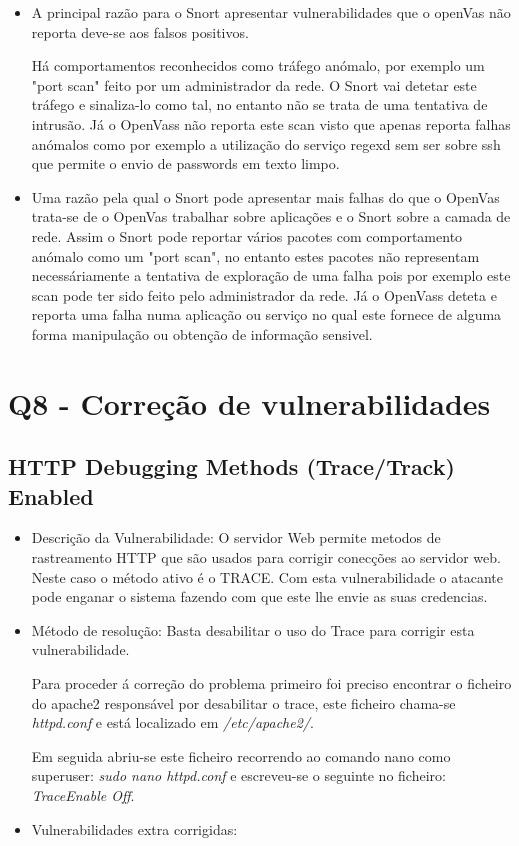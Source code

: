 \begin{itemize}
\item A principal razão para o Snort apresentar vulnerabilidades que o openVas não reporta deve-se aos falsos positivos.
\par Há comportamentos reconhecidos como tráfego anómalo, por exemplo um "port scan" feito por um administrador da rede. O Snort vai detetar este tráfego e sinaliza-lo como tal, no entanto não se trata de uma tentativa de intrusão. Já o OpenVass não reporta este scan visto que apenas reporta falhas anómalos como por exemplo a utilização do serviço regexd sem ser sobre ssh que permite o envio de passwords em texto limpo.   

\item Uma razão pela qual o Snort pode apresentar mais falhas do que o OpenVas trata-se de o OpenVas trabalhar sobre aplicações e o Snort sobre a camada de rede. Assim o Snort pode reportar vários pacotes com comportamento anómalo como um "port scan", no entanto estes pacotes não representam necessáriamente a tentativa de exploração de uma falha pois por exemplo este scan pode ter sido feito pelo administrador da rede. Já o OpenVass deteta e reporta uma falha numa aplicação ou serviço no qual este fornece de alguma forma manipulação ou obtenção de informação sensivel.

\end{itemize}
\section{Q8 - Correção de vulnerabilidades}

\subsection{HTTP Debugging Methods (Trace/Track) Enabled}

\begin{itemize}
\item Descrição da Vulnerabilidade: O servidor Web permite metodos de rastreamento HTTP que são usados para corrigir conecções ao servidor web.
Neste caso o método ativo é o TRACE. Com esta vulnerabilidade o atacante pode enganar o sistema fazendo com que este lhe envie as suas credencias.

\item Método de resolução: Basta desabilitar o uso do Trace para corrigir esta vulnerabilidade.

\par Para proceder á correção do problema primeiro foi preciso encontrar o ficheiro do apache2 responsável por desabilitar o trace, este ficheiro chama-se \textit{httpd.conf} e está localizado em \textit{/etc/apache2/}.
\par Em seguida abriu-se este ficheiro recorrendo ao comando nano como superuser: \textit{sudo nano httpd.conf} e escreveu-se o seguinte no ficheiro: \textit{TraceEnable Off}.

\item Vulnerabilidades extra corrigidas:
\end{itemize}

